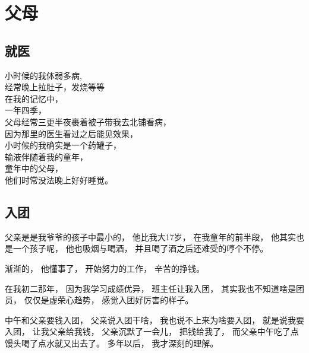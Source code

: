 
\chapter{父母}

\section{就医}

小时候的我体弱多病, \\
经常晚上拉肚子，发烧等等\\
在我的记忆中，\\
一年四季，\\
父母经常三更半夜裹着被子带我去北铺看病，\\
因为那里的医生看过之后能见效果，\\
小时候的我确实是一个药罐子，\\
输液伴随着我的童年，\\
童年中的父母，\\
他们时常没法晚上好好睡觉。


\section{入团}


父亲是是我爷爷的孩子中最小的，
他比我大17岁，
在我童年的前半段，
他其实也是一个孩子呢，
他也吸烟与喝酒，
并且喝了酒之后还难受的哼个不停。


渐渐的，
他懂事了，
开始努力的工作，
辛苦的挣钱。

在我初二那年，
因为我学习成绩优异，
班主任让我入团，
其实我也不知道啥是团员，
仅仅是虚荣心趋势，
感觉入团好厉害的样子。


中午和父亲要钱入团，
父亲说入团干啥，
我也说不上来为啥要入团，
就是说我要入团，
让我父亲给我钱，
父亲沉默了一会儿，
把钱给我了，
而父亲中午吃了点馒头喝了点水就又出去了。
多年以后，
我才深刻的理解。









